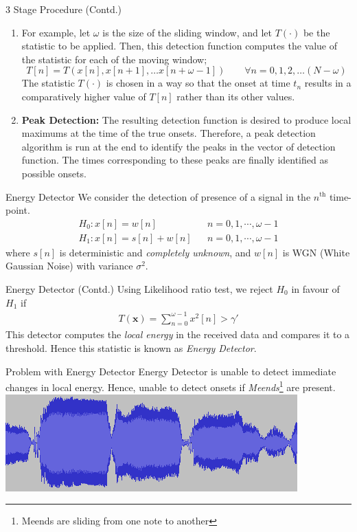 \documentclass[10pt]{beamer}
\begin{document}
\begin{frame}{3 Stage Procedure (Contd.)}
    \begin{enumerate}
        \item For example, let $\omega$ is the size of the sliding window, and let $T(\cdot)$ be the statistic to be applied. Then, this detection function computes the value of the statistic for each of the moving window;
        $$T[n] = T(x[n], x[n+1], \dots x[n+\omega - 1]) \qquad \forall n = 0,1,2, \dots (N-\omega)$$
        The statistic $T(\cdot)$ is chosen in a way so that the onset at time $t_n$ results in a comparatively higher value of $T[n]$ rather than its other values.
        \pause
        \item \textbf{Peak Detection:} The resulting detection function is desired to produce local maximums at the time of the true onsets. Therefore, a peak detection algorithm is run at the end to identify the peaks in the vector of detection function. The times corresponding to these peaks are finally identified as possible onsets.
    \end{enumerate}
\end{frame}

\begin{frame}{Energy Detector}
We consider the detection of presence of a signal in the $n^\text{th}$ time-point.
\begin{align*}
H_0: x[n]=w[n]  &&  n=0,1,\cdots, \omega-1\\ 
H_1: x[n]=s[n]+w[n] && n=0,1,\cdots, \omega-1 
\end{align*}
where $s[n]$ is deterministic and \textit{completely unknown}, and $w[n]$ is WGN (White Gaussian Noise) with variance $\sigma^2$.
\end{frame}

\begin{frame}{Energy Detector (Contd.)}
    Using Likelihood ratio test, we reject $H_0$ in favour of $H_1$ if
\begin{align}
   T(\textbf{x})= \displaystyle\sum_{n=0}^{\omega-1}x^2[n] > \gamma'
\end{align}
This detector computes the \textit{local energy} in the received data and compares it to a threshold. Hence this statistic is known as \textit{Energy Detector}.
\end{frame}


\begin{frame}{Problem with Energy Detector}
    Energy Detector is unable to detect immediate changes in local energy. Hence, unable to detect onsets if \textit{Meends}\footnote{Meends are sliding from one note to another} are present.
    \includegraphics[width = \textwidth]{fig/onset_blob.png}
\end{frame}
\end{document}
